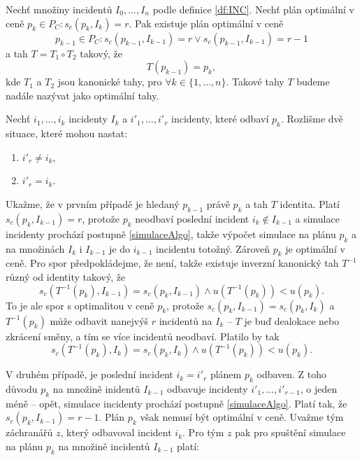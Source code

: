 \begin{veta}\label{veta:optimalniTahy}
  Nechť množiny incidentů $I_0, \dots, I_n$ podle definice \ref{df:INC}.
  Nechť plán optimální v ceně $p_k \in P_C \colon s_c(p_k, I_k) = r$.
  Pak existuje plán optimální v ceně
  \begin{equation*}
    p_{k-1} \in P_C \colon s_c(p_{k-1}, I_{k-1}) = r \lor s_c(p_{k-1}, I_{k-1}) = r - 1
  \end{equation*}
  a tah $T = T_1 \circ T_2$ takový, že
  \begin{equation*}
    T(p_{k-1}) = p_k,
  \end{equation*}
  kde $T_1$ a $T_2$ jsou kanonické tahy, pro $\forall k \in \{ 1, \dots, n \}$.
  Takové tahy $T$ budeme nadále nazývat jako optimální tahy.
\end{veta}
\begin{dukaz}
  Nechť $i_1, \dots, i_k$ incidenty $I_k$ a $i'_1, \dots, i'_r$ incidenty, které odbaví $p_k$.
  Rozlišme dvě situace, které mohou nastat:
  \begin{enumerate}
    \item
      $i'_r \neq i_k$,

    \item
      $i'_r = i_k$.
  \end{enumerate}
  Ukažme, že v prvním případě je hledaný $p_{k-1}$ právě $p_k$ a tah $T$ identita.
  Platí $s_c(p_k, I_{k-1}) = r$, protože $p_k$ neodbaví poslední incident $i_k \not \in I_{k-1}$ a simulace incidenty prochází postupně \ref{simulaceAlgo},
  takže výpočet simulace na plánu $p_{k}$ a na množinách $I_k$ i $I_{k-1}$ je do $i_{k-1}$ incidentu totožný.
  Zároveň $p_k$ je optimální v ceně. Pro spor předpokládejme, že není, takže existuje inverzní kanonický tah $T^{-1}$ různý od identity takový,
  že
  \begin{equation*}
    s_c(T^{-1}(p_k), I_{k-1}) = s_c(p_k, I_{k-1}) \land u(T^{-1}(p_k)) < u(p_k).
  \end{equation*}
  To je ale spor s optimalitou v ceně $p_k$, protože $s_c(p_k, I_{k-1}) = s_c(p_k, I_k)$ a $T^{-1}(p_k)$ může odbavit nanejvýš $r$ incidentů na $I_k$ -- $T$ je buď dealokace nebo zkrácení směny,
  a tím se více incidentů neodbaví.
  Platilo by tak
  \begin{equation*}
    s_c(T^{-1}(p_k), I_{k}) = s_c(p_k, I_{k}) \land u(T^{-1}(p_k)) < u(p_k).
  \end{equation*}

  V druhém případě, je poslední incident $i_k = i'_r$ plánem $p_k$ odbaven.
  Z toho důvodu $p_k$ na množině inidentů $I_{k-1}$ odbavuje incidenty $i'_1, \dots, i'_{r-1}$, o jeden méně -- opět, simulace incidenty prochází postupně \ref{simulaceAlgo}.
  Platí tak, že $s_c(p_k, I_{k-1}) = r - 1$. Plán $p_k$ však nemusí být optimální v ceně. Uvažme tým záchranářů $z$, který odbavoval incident $i_k$.
  Pro tým $z$ pak pro spuštění simulace na plánu $p_k$ na množině incidentů $I_{k-1}$ platí:


\end{dukaz}
